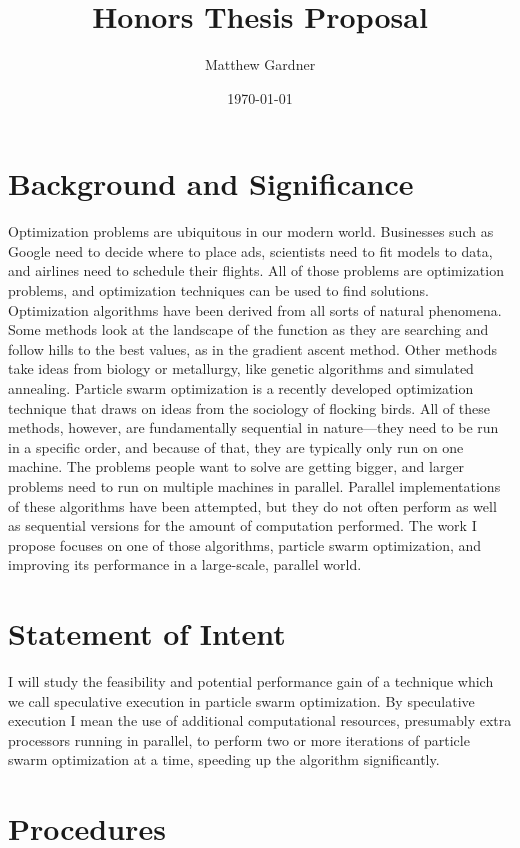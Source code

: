 \documentclass[onecolumn, 12pt]{article}
\title{Honors Thesis Proposal}
\author{Matthew Gardner}
\date{\today}
\begin{document}
\maketitle

\section{Background and Significance}

Optimization problems are ubiquitous in our modern world.  Businesses such as
Google need to decide where to place ads, scientists need to fit models to
data, and airlines need to schedule their flights.  All of those problems are
optimization problems, and optimization techniques can be used to find
solutions.  Optimization algorithms have been derived from all sorts of natural
phenomena.  Some methods look at the landscape of the function as they are
searching and follow hills to the best values, as in the gradient ascent
method.  Other methods take ideas from biology or metallurgy, like genetic
algorithms and simulated annealing.  Particle swarm optimization is a recently
developed optimization technique that draws on ideas from the sociology of
flocking birds.  All of these methods, however, are fundamentally sequential in
nature---they need to be run in a specific order, and because of that, they are
typically only run on one machine.  The problems people want to solve are
getting bigger, and larger problems need to run on multiple machines in
parallel.  Parallel implementations of these algorithms have been attempted,
but they do not often perform as well as sequential versions for the amount of
computation performed.  The work I propose focuses on one of those algorithms,
particle swarm optimization, and improving its performance in a large-scale,
parallel world.

\section{Statement of Intent}

I will study the feasibility and potential performance gain of a technique
which we call speculative execution in particle swarm optimization.  By
speculative execution I mean the use of additional computational resources,
presumably extra processors running in parallel, to perform two or more
iterations of particle swarm optimization at a time, speeding up the algorithm
significantly.

\section{Procedures}
\end{document}
